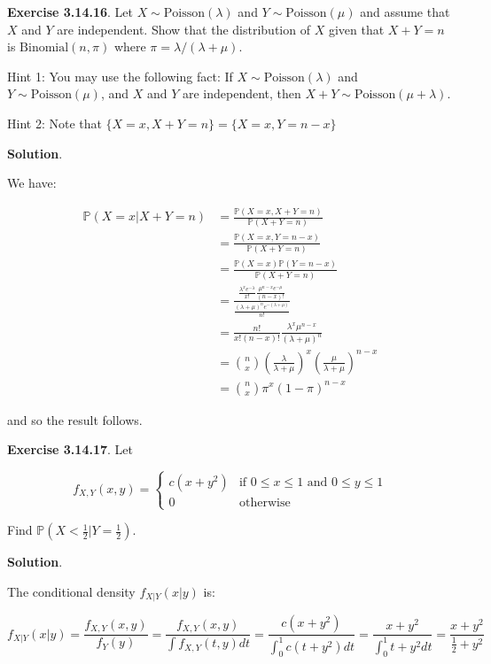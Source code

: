 \textbf{Exercise 3.14.16}. Let \(X \sim \text{Poisson}(\lambda)\) and
\(Y \sim \text{Poisson}(\mu)\) and assume that \(X\) and \(Y\) are
independent. Show that the distribution of \(X\) given that
\(X + Y = n\) is \(\text{Binomial}(n, \pi)\) where
\(\pi = \lambda / (\lambda + \mu)\).

Hint 1: You may use the following fact: If
\(X \sim \text{Poisson}(\lambda)\) and \(Y \sim \text{Poisson}(\mu)\),
and \(X\) and \(Y\) are independent, then
\(X + Y \sim \text{Poisson}(\mu + \lambda)\).

Hint 2: Note that \(\{X = x, X + Y = n\} = \{X = x, Y = n - x \}\)

\textbf{Solution}.

We have:

\begin{align*}
\mathbb{P}(X = x | X + Y = n) &= \frac{\mathbb{P}(X = x, X + Y = n)}{\mathbb{P}(X + Y = n)} \\
&= \frac{\mathbb{P}(X = x, Y = n - x)}{\mathbb{P}(X + Y = n)} \\
&= \frac{\mathbb{P}(X = x) \mathbb{P}(Y = n - x)}{\mathbb{P}(X + Y = n)} \\
&= \frac{\frac{\lambda^x e^{-\lambda}}{x!} \frac{\mu^{n - x} e^{-\mu}}{(n - x)!} }{\frac{(\lambda + \mu)^{n} e^{-(\lambda + \mu)}}{n!}} \\
&= \frac{n!}{x! (n - x)!} \frac{\lambda^x \mu^{n - x}}{(\lambda + \mu)^{n}} \\
&= \binom{n}{x} \left( \frac{\lambda}{\lambda + \mu} \right)^x \left( \frac{\mu}{\lambda + \mu}\right)^{n - x} \\
&= \binom{n}{x} \pi^x (1 - \pi)^{n - x}
\end{align*}

and so the result follows.

\textbf{Exercise 3.14.17}. Let

\[
f_{X, Y}(x, y) = \begin{cases}
c(x + y^{2}) &\text{if } 0 \leq x \leq 1 \text{ and }  0 \leq y \leq 1 \\
0 & \text{otherwise}
\end{cases}
\]

Find \(\mathbb{P}\left( X < \frac{1}{2} | Y = \frac{1}{2} \right)\).

\textbf{Solution}.

The conditional density \(f_{X | Y}(x | y)\) is:

\[ f_{X|Y}(x | y) = \frac{f_{X, Y}(x, y)}{f_Y(y)} = \frac{f_{X, Y}(x, y)}{\int f_{X, Y}(t, y) dt}
= \frac{ c(x + y^{2}) }{\int_{0}^{1} c(t + y^{2}) dt} =  \frac{ x + y^{2} }{\int_{0}^{1} t + y^{2} dt} = \frac{x + y^{2}}{\frac{1}{2} + y^{2}} \]

